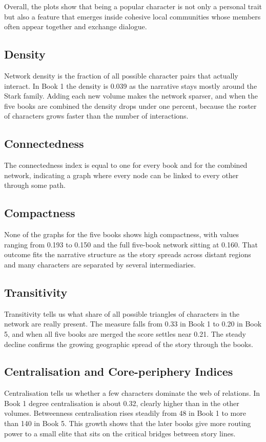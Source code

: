 \documentclass[12pt, a4paper]{article}
\begin{document}
   Overall, the plots show that being a popular character is not only a personal trait but also a feature that emerges inside cohesive local communities whose members often appear together and exchange dialogue.

\subsection*{Density}
Network density is the fraction of all possible character pairs that actually interact. In Book 1 the density is 0.039 as the narrative stays mostly around the Stark family. Adding each new volume makes the network sparser, and when the five books are combined the density drops under one percent, because the roster of characters grows faster than the number of interactions.

\subsection*{Connectedness}
The connectedness index is equal to one for every book and for the combined network, indicating a graph where every node can be linked to every other through some path. 

\subsection*{Compactness}
None of the graphs for the five books shows high compactness, with values ranging from 0.193 to 0.150 and the full five-book network sitting at 0.160. That outcome fits the narrative structure as the story spreads across distant regions and many characters are separated by several intermediaries. 

\subsection*{Transitivity}
Transitivity tells us what share of all possible triangles of characters in the network are really present. The measure falls from 0.33 in Book 1 to 0.20 in Book 5, and when all five books are merged the score settles near 0.21. The steady decline confirms the growing geographic spread of the story through the books. 


\subsection*{Centralisation and Core-periphery Indices}
Centralisation tells us whether a few characters dominate the web of relations. In Book 1 degree centralisation is about 0.32, clearly higher than in the other volumes. Betweenness centralisation rises steadily from 48 in Book 1 to more than 140 in Book 5. This growth shows that the later books give more routing power to a small elite that sits on the critical bridges between story lines.
\end{document}
